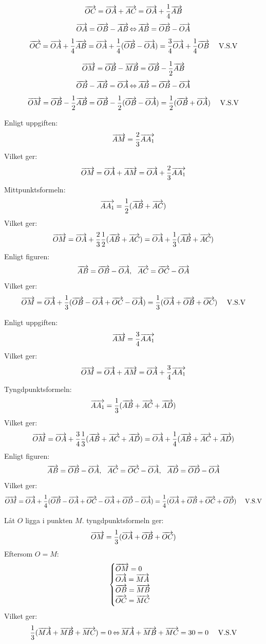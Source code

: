 \begin{task}{2.4}
	\[\vek{OC}=\vek{OA}+\vek{AC}=\vek{OA}+\frac{1}{4}\vek{AB}\]
	\[\vek{OA}=\vek{OB}-\vek{AB} \lra
	\vek{AB}=\vek{OB}-\vek{OA}\]
	\[\vek{OC}=
	\vek{OA}+\frac{1}{4}\vek{AB}=
	\vek{OA}+\frac{1}{4}(\vek{OB}-\vek{OA})=
	\frac{3}{4}\vek{OA}+\frac{1}{4}\vek{OB} \mproof\]
\end{task}

\begin{task}{2.5}
	\[\vek{OM}=\vek{OB}-\vek{MB}=\vek{OB}-\frac{1}{2}\vek{AB}\]
	\[\vek{OB}-\vek{AB}=\vek{OA} \lra
	\vek{AB}=\vek{OB}-\vek{OA}\]
	\[\vek{OM}=
	\vek{OB}-\frac{1}{2}\vek{AB}=
	\vek{OB}-\frac{1}{2}(\vek{OB}-\vek{OA})=
	\frac{1}{2}(\vek{OB}+\vek{OA}) \mproof\]
\end{task}

\begin{task}{2.6}
	Enligt uppgiften:
	\[\vek{AM}=\frac{2}{3}\vek{AA_1}\]
	Vilket ger:
	\[\vek{OM}=
	\vek{OA}+\vek{AM}=
	\vek{OA}+\frac{2}{3}\vek{AA_1}\]
	Mittpunktsformeln:
	\[\vek{AA_1}=\frac{1}{2}(\vek{AB}+\vek{AC})\]
	Vilket ger:
	\[\vek{OM}=
	\vek{OA}+\frac{2}{3}\*\frac{1}{2}(\vek{AB}+\vek{AC})=
	\vek{OA}+\frac{1}{3}(\vek{AB}+\vek{AC})\]
	Enligt figuren:
	\[\vek{AB}=\vek{OB}-\vek{OA},~~
	\vek{AC}=\vek{OC}-\vek{OA}\]
	Vilket ger:
	\[\vek{OM}=
	\vek{OA}+\frac{1}{3}(\vek{OB}-\vek{OA}+\vek{OC}-\vek{OA})=
	\frac{1}{3}(\vek{OA}+\vek{OB}+\vek{OC}) \mproof\]
\end{task}

\begin{task}{2.7}
	Enligt uppgiften:
	\[\vek{AM}=\frac{3}{4}\vek{AA_1}\]
	Vilket ger:
	\[\vek{OM}=
	\vek{OA}+\vek{AM}=
	\vek{OA}+\frac{3}{4}\vek{AA_1}\]
	Tyngdpunktsformeln:
	\[\vek{AA_1}=\frac{1}{3}(\vek{AB}+\vek{AC}+\vek{AD})\]
	Vilket ger:
	\[\vek{OM}=
	\vek{OA}+\frac{3}{4}\*\frac{1}{3}(\vek{AB}+\vek{AC}+\vek{AD})=
	\vek{OA}+\frac{1}{4}(\vek{AB}+\vek{AC}+\vek{AD})\]
	Enligt figuren:
	\[\vek{AB}=\vek{OB}-\vek{OA},~~
	\vek{AC}=\vek{OC}-\vek{OA},~~
	\vek{AD}=\vek{OD}-\vek{OA}\]
	Vilket ger:
	\[\vek{OM}=
	\vek{OA}+\frac{1}{4}(\vek{OB}-\vek{OA}+\vek{OC}-\vek{OA}+\vek{OD}-\vek{OA})=
	\frac{1}{4}(\vek{OA}+\vek{OB}+\vek{OC}+\vek{OD}) \text{~~~~V.S.V}\]
\end{task}

\begin{task}{2.8}
	Låt $O$ ligga i punkten $M$. tyngdpunktsformeln ger:
	\[\vek{OM}=\frac{1}{3}(\vek{OA}+\vek{OB}+\vek{OC})\]
	Eftersom $O=M$:
	\[\begin{cases}
	\vek{OM}=0 \\
	\vek{OA}=\vek{MA} \\
	\vek{OB}=\vek{MB} \\
	\vek{OC}=\vek{MC}
	\end{cases}\]
	Vilket ger:
	\[\frac{1}{3}(\vek{MA}+\vek{MB}+\vek{MC})=0 \lra
	\vek{MA}+\vek{MB}+\vek{MC}=3\*0=0 \text{~~~~V.S.V}\]
\end{task}

